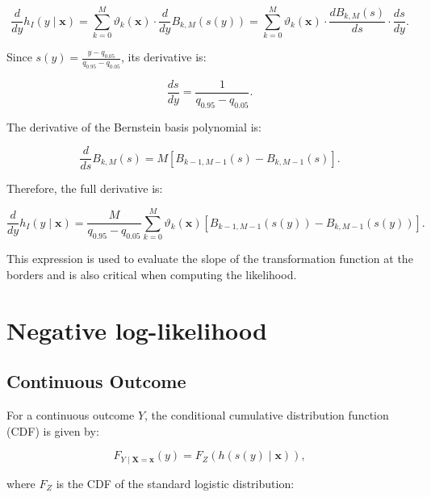 \begin{equation}
\frac{d}{dy} h_I(y \mid \mathbf{x}) = \sum_{k=0}^{M} \vartheta_k(\mathbf{x}) \cdot \frac{d}{dy} B_{k, M}(s(y)) = \sum_{k=0}^{M} \vartheta_k(\mathbf{x}) \cdot \frac{dB_{k, M}(s)}{ds} \cdot \frac{ds}{dy}.
\end{equation}


Since $s(y) = \frac{y - q_{0.05}}{q_{0.95} - q_{0.05}}$, its derivative is:

\begin{equation}
\frac{ds}{dy} = \frac{1}{q_{0.95} - q_{0.05}}.
\end{equation}

The derivative of the Bernstein basis polynomial is:

\begin{equation}
\frac{d}{ds} B_{k, M}(s) = M \left[ B_{k - 1, M - 1}(s) - B_{k, M - 1}(s) \right].
\end{equation}


Therefore, the full derivative is:

\begin{equation}
\frac{d}{dy} h_I(y \mid \mathbf{x}) = \frac{M}{q_{0.95} - q_{0.05}} \sum_{k=0}^{M} \vartheta_k(\mathbf{x}) \left[ B_{k - 1, M - 1}(s(y)) - B_{k, M - 1}(s(y)) \right].
\end{equation}

This expression is used to evaluate the slope of the transformation function at the borders and is also critical when computing the likelihood.





\section{Negative log-likelihood} \label{sec:nll}

\subsection{Continuous Outcome}

For a continuous outcome $Y$, the conditional cumulative distribution function (CDF) is given by:

\begin{equation}
F_{Y \mid \mathbf{X} = \mathbf{x}}(y) = F_Z(h(s(y) \mid \mathbf{x})),
\end{equation}

where $F_Z$ is the CDF of the standard logistic distribution:

